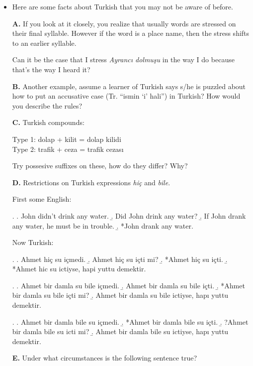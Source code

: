 \documentclass[11pt]{article}
\begin{document}
\begin{itemize}
\item Here are some facts about Turkish that you may not be aware of before. 

\item[\bf A.] If you look at it closely, you realize that usually words are
stressed on their final syllable. However if the word is a place name, then the
stress shifts to an earlier syllable. 

\item[] Can it be the case that I stress \emph{Ayranc\i{} dolmu\c su}  in the way
I do because that's the way I heard it?

\item[\bf B.] Another example, assume a learner of Turkish says s/he is puzzled about how to put an accusative case (Tr. ``ismin `i' hali'') in Turkish?   How would you describe the rules? 

\item[\bf C.] Turkish compounds:
	
\item[] Type 1: dolap + kilit = dolap kilidi\\
		Type 2: trafik + ceza = trafik cezası

		Try possesive suffixes on these, how do they differ? Why?	

\item[\bf D.] Restrictions on Turkish expressions \emph{hiç} and \emph{bile}.   

\item[] First some English:

\ex. \a. John didn't drink any water.
\b. Did John drink any water?
\b. If John drank any water, he must be in trouble.
\b. *John drank any water.

\item[] Now Turkish:

\ex. 
\a. Ahmet hiç su içmedi.
\b. Ahmet hiç su içti mi?
\b. *Ahmet hiç su içti.
\b. *Ahmet hic su ictiyse, hapi yuttu demektir.

\ex. 
\a. Ahmet bir damla su bile içmedi.
\b. Ahmet bir damla su bile içti.
\b. *Ahmet bir damla su bile içti mi?
\b. Ahmet bir damla su bile ictiyse, hapı yuttu demektir.

\ex.
\a. Ahmet bir damla bile su içmedi.
\b. *Ahmet bir damla bile su içti.
\b. ?Ahmet bir damla bile su icti mi?
\b. Ahmet bir damla bile su ictiyse, hapı yuttu demektir.

\item[\bf E.] Under what circumstances is the following sentence true? 


\end{itemize}
\end{document}

